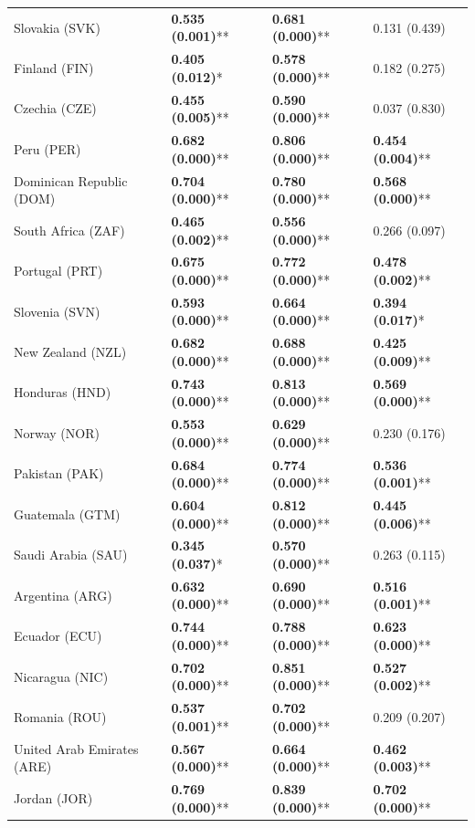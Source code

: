 \begin{longtable}{p{4cm}p{3cm}p{3cm}p{3cm}}
Slovakia (SVK) & \textbf{0.535 (0.001)}** & \textbf{0.681 (0.000)}** & 0.131 (0.439) \\
Finland (FIN) & \textbf{0.405 (0.012)}* & \textbf{0.578 (0.000)}** & 0.182 (0.275) \\
Czechia (CZE) & \textbf{0.455 (0.005)}** & \textbf{0.590 (0.000)}** & 0.037 (0.830) \\
Peru (PER) & \textbf{0.682 (0.000)}** & \textbf{0.806 (0.000)}** & \textbf{0.454 (0.004)}** \\
Dominican Republic (DOM) & \textbf{0.704 (0.000)}** & \textbf{0.780 (0.000)}** & \textbf{0.568 (0.000)}** \\
South Africa (ZAF) & \textbf{0.465 (0.002)}** & \textbf{0.556 (0.000)}** & 0.266 (0.097) \\
Portugal (PRT) & \textbf{0.675 (0.000)}** & \textbf{0.772 (0.000)}** & \textbf{0.478 (0.002)}** \\
Slovenia (SVN) & \textbf{0.593 (0.000)}** & \textbf{0.664 (0.000)}** & \textbf{0.394 (0.017)}* \\
New Zealand (NZL) & \textbf{0.682 (0.000)}** & \textbf{0.688 (0.000)}** & \textbf{0.425 (0.009)}** \\
Honduras (HND) & \textbf{0.743 (0.000)}** & \textbf{0.813 (0.000)}** & \textbf{0.569 (0.000)}** \\
Norway (NOR) & \textbf{0.553 (0.000)}** & \textbf{0.629 (0.000)}** & 0.230 (0.176) \\
Pakistan (PAK) & \textbf{0.684 (0.000)}** & \textbf{0.774 (0.000)}** & \textbf{0.536 (0.001)}** \\
Guatemala (GTM) & \textbf{0.604 (0.000)}** & \textbf{0.812 (0.000)}** & \textbf{0.445 (0.006)}** \\
Saudi Arabia (SAU) & \textbf{0.345 (0.037)}* & \textbf{0.570 (0.000)}** & 0.263 (0.115) \\
Argentina (ARG) & \textbf{0.632 (0.000)}** & \textbf{0.690 (0.000)}** & \textbf{0.516 (0.001)}** \\
Ecuador (ECU) & \textbf{0.744 (0.000)}** & \textbf{0.788 (0.000)}** & \textbf{0.623 (0.000)}** \\
Nicaragua (NIC) & \textbf{0.702 (0.000)}** & \textbf{0.851 (0.000)}** & \textbf{0.527 (0.002)}** \\
Romania (ROU) & \textbf{0.537 (0.001)}** & \textbf{0.702 (0.000)}** & 0.209 (0.207) \\
United Arab Emirates (ARE) & \textbf{0.567 (0.000)}** & \textbf{0.664 (0.000)}** & \textbf{0.462 (0.003)}** \\
Jordan (JOR) & \textbf{0.769 (0.000)}** & \textbf{0.839 (0.000)}** & \textbf{0.702 (0.000)}** \\

\end{longtable}
